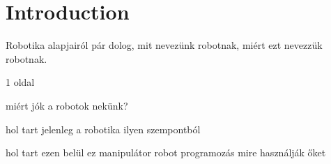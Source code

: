 \newpage

\thispagestyle{empty}

\chapter{Introduction}

Robotika alapjairól pár dolog, mit nevezünk robotnak, miért ezt nevezzük robotnak.

1 oldal

miért jók a robotok nekünk?

hol tart jelenleg a robotika ilyen szempontból

hol tart ezen belül ez manipulátor robot programozás
mire használják őket